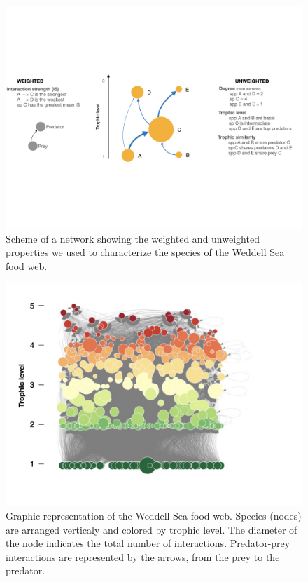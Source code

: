 \documentclass[gc, manuscript]{copernicus}
\begin{document}
\clearpage

\begin{figure}
\includegraphics[width=12cm]{Fig.2_ToyFoodWeb} \caption{Scheme of a network showing the weighted and unweighted properties we used to characterize the species of the Weddell Sea food web.}\label{fig:unnamed-chunk-2}
\end{figure}

\clearpage

\begin{figure}
\includegraphics[width=12cm]{Fig.3_WeddellSeaNet} \caption{Graphic representation of the Weddell Sea food web. Species (nodes) are arranged verticaly and colored by trophic level. The diameter of the node indicates the total number of interactions. Predator-prey interactions are represented by the arrows, from the prey to the predator.}\label{fig:unnamed-chunk-3}
\end{figure}
\end{document}
